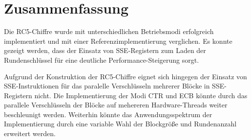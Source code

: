 \documentclass[course=erap]{aspdoc}
\begin{document}
\section{Zusammenfassung}

Die RC5-Chiffre wurde mit unterschiedlichen Betriebsmodi erfolgreich implementiert und mit einer Referenzimplementierung verglichen. Es konnte gezeigt werden, dass der Einsatz von SSE-Registern zum Laden der Rundenschlüssel für eine deutliche Performance-Steigerung sorgt.\bigbreak

Aufgrund der Konstruktion der RC5-Chiffre eignet sich hingegen der Einsatz von SSE-Instruktionen für das paralelle Verschlüsseln mehrerer Blöcke in SSE-Registern nicht. Die Implementierung der Modi CTR und ECB könnte durch das parallele Verschlüsseln der Blöcke auf mehereren Hardware-Threads weiter beschleunigt werden. Weiterhin könnte das Anwendungsspektrum der Implementierung durch eine variable Wahl der Blockgröße und Rundenanzahl erweitert werden.

\newpage
\printbibliography
\end{document}
